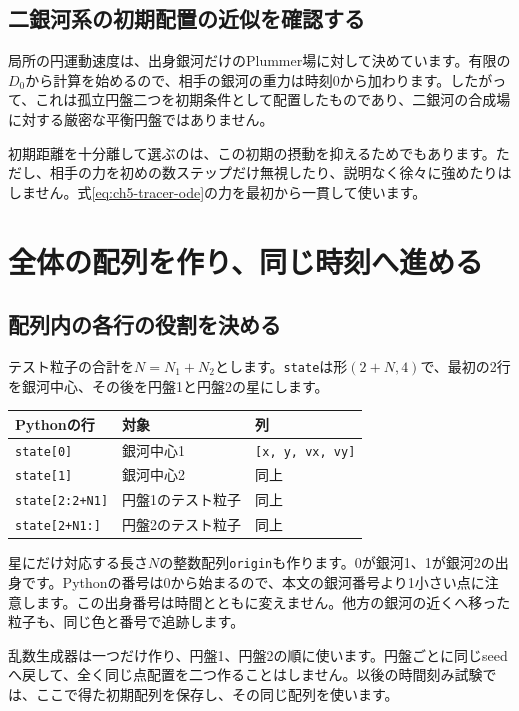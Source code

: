 \subsection{二銀河系の初期配置の近似を確認する}
局所の円運動速度は、出身銀河だけのPlummer場に対して決めています。有限の$D_0$から計算を始めるので、相手の銀河の重力は時刻0から加わります。したがって、これは孤立円盤二つを初期条件として配置したものであり、二銀河の合成場に対する厳密な平衡円盤ではありません。

初期距離を十分離して選ぶのは、この初期の摂動を抑えるためでもあります。ただし、相手の力を初めの数ステップだけ無視したり、説明なく徐々に強めたりはしません。式\eqref{eq:ch5-tracer-ode}の力を最初から一貫して使います。

\section{全体の配列を作り、同じ時刻へ進める}
\label{sec:ch5-integration}
\subsection{配列内の各行の役割を決める}
テスト粒子の合計を$N=N_1+N_2$とします。\texttt{state}は形$(2+N,4)$で、最初の2行を銀河中心、その後を円盤1と円盤2の星にします。
\begin{center}
\begin{tabular}{lll}
\toprule
Pythonの行 & 対象 & 列 \\
\midrule
\texttt{state[0]} & 銀河中心1 & \texttt{[x, y, vx, vy]} \\
\texttt{state[1]} & 銀河中心2 & 同上 \\
\texttt{state[2:2+N1]} & 円盤1のテスト粒子 & 同上 \\
\texttt{state[2+N1:]} & 円盤2のテスト粒子 & 同上 \\
\bottomrule
\end{tabular}
\end{center}

星にだけ対応する長さ$N$の整数配列\texttt{origin}も作ります。0が銀河1、1が銀河2の出身です。Pythonの番号は0から始まるので、本文の銀河番号より1小さい点に注意します。この出身番号は時間とともに変えません。他方の銀河の近くへ移った粒子も、同じ色と番号で追跡します。

乱数生成器は一つだけ作り、円盤1、円盤2の順に使います。円盤ごとに同じseedへ戻して、全く同じ点配置を二つ作ることはしません。以後の時間刻み試験では、ここで得た初期配列を保存し、その同じ配列を使います。


